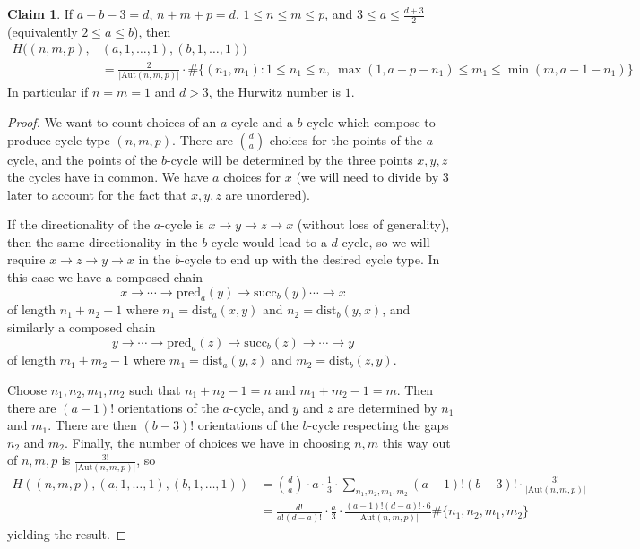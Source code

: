 \documentclass[thesis]{thesis-umich}           %
\newcommand{\Aut}{\text{Aut}}
\theoremstyle{definition}
\newtheorem{claim}[thm]{Claim}
\begin{document}
\begin{claim}
  If $a+b-3=d$, $n+m+p=d$, $1\leq n\leq m\leq p$, and $3\leq a\leq \frac{d+3}{2}$ (equivalently $2\leq a\leq b$), then
\begin{align*}
  H((n,m,p),&(a,1,\dots,1),(b,1,\dots,1))\\
  &=\frac 2{|\Aut(n,m,p)|}\cdot \#\{(n_1,m_1):1\leq n_1\leq n,\ \max(1,a-p-n_1)\leq m_1\leq \min(m,a-1-n_1)\}
\end{align*}
In particular if $n=m=1$ and $d>3$, the Hurwitz number is $1$.
\end{claim}
\begin{proof}
  We want to count choices of an $a$-cycle and a $b$-cycle which compose to produce cycle type $(n,m,p)$.
  There are $\binom da$ choices for the points of the $a$-cycle, and the
  points of the $b$-cycle will be determined by the three points $x,y,z$ the cycles have in common. We have $a$ choices for
  $x$ (we will need to divide by $3$ later to account for the fact that $x,y,z$ are unordered).

  If the directionality of the $a$-cycle is $x\to y\to z\to x$ (without loss of generality), then the same directionality in the $b$-cycle would lead to
  a $d$-cycle, so we will require $x\to z\to y\to x$ in the $b$-cycle to end up with the desired cycle type. In this case
  we have a composed chain \[x\to\cdots\to \text{pred}_a(y)\to\text{succ}_b(y)\cdots\to x\] of length $n_1+n_2-1$ where $n_1=\text{dist}_a(x,y)$ and $n_2=\text{dist}_b(y,x)$, and similarly a composed chain
  \[
  y\to\cdots\to\text{pred}_a(z)\to\text{succ}_b(z)\to\cdots\to y
  \]
  of length $m_1+m_2-1$ where $m_1=\text{dist}_a(y,z)$ and $m_2=\text{dist}_b(z,y)$.

  Choose $n_1,n_2,m_1,m_2$ such that $n_1+n_2-1=n$ and $m_1+m_2-1=m$. Then there are $(a-1)!$ orientations of the $a$-cycle, and $y$ and $z$ are determined by $n_1$ and $m_1$. There are then $(b-3)!$ orientations of the $b$-cycle respecting the gaps $n_2$ and $m_2$. Finally, the number of choices we have in choosing $n,m$ this way out of $n,m,p$ is $\frac{3!}{|\Aut(n,m,p)|}$, so
  \begin{align*}
    H((n,m,p),(a,1,\dots,1),(b,1,\dots,1))&=\binom da\cdot a\cdot\frac 13\cdot\sum_{n_1,n_2,m_1,m_2}(a-1)!(b-3)!\cdot\frac{3!}{|\Aut(n,m,p)|} \\
    &=\frac{d!}{a!(d-a)!}\cdot\frac a3\cdot\frac{(a-1)!(d-a)!\cdot 6}{|\Aut(n,m,p)|}\#\{n_1,n_2,m_1,m_2\}
  \end{align*}
  yielding the result.
  
\end{proof}
\end{document}
